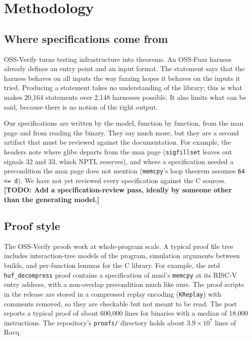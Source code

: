 \documentclass[11pt]{article}
\newcommand{\todo}[1]{\textbf{[TODO: #1]}}
\newcommand{\code}[1]{\texttt{#1}}
\begin{document}
\section{Methodology}\label{sec:method}

\subsection{Where specifications come from}

OSS-Verify turns testing infrastructure into theorems.  An OSS-Fuzz harness
already defines an entry point and an input format.  The statement says that
the harness behaves on all inputs the way fuzzing hopes it behaves on the
inputs it tried.  Producing a statement takes no understanding of the
library; this is what makes 20{,}164 statements over 2{,}148 harnesses
possible.  It also limits what can be said, because there is no notion of
the right output.

Our specifications are written by the model, function by function, from the
man page and from reading the binary.  They say much more, but they are a
second artifact that must be reviewed against the documentation.  For
example, the headers note where glibc departs from the man page
(\code{sigfillset} leaves out signals 32 and 33, which NPTL reserves), and
where a specification needed a precondition the man page does not mention
(\code{memcpy}'s loop theorem assumes \code{64 <= d}).  We have not yet
reviewed every specification against the C sources.
\todo{Add a specification-review pass, ideally by someone other than the
generating model.}

\subsection{Proof style}\label{sec:proofstyle}

The OSS-Verify proofs work at whole-program scale.  A typical proof file
tree includes interaction-tree models of the program, simulation arguments
between builds, and per-function lemmas for the C library.  For example,
the zstd \code{huf\_decompress} proof contains a specification of musl's
\code{memcpy} at its RISC-V entry address, with a non-overlap precondition
much like ours.  The proof scripts in the release are stored in a compressed
replay encoding (\code{KReplay}) with comments removed, so they are checkable
but not meant to be read.  The post reports a typical proof of about
600{,}000 lines for binaries with a median of 18{,}000 instructions.  The
repository's \code{proofs/} directory holds about $3.9\times10^7$ lines of
Rocq.
\end{document}
